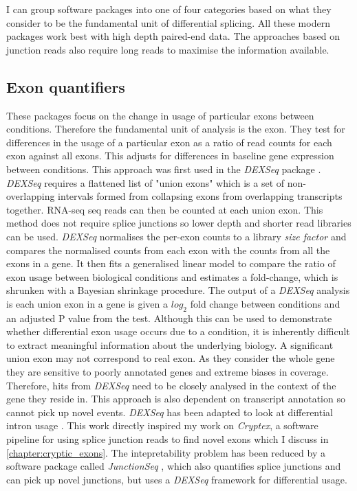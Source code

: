 I can group software packages into one of four categories based on what they consider to be the fundamental unit of differential splicing. 
All these modern packages work best with high depth paired-end data.
The approaches based on junction reads also require long reads to maximise the information available.

\subsection{Exon quantifiers}

These packages focus on the change in usage of particular exons between conditions. Therefore the fundamental unit of analysis is the exon.
They test for differences in the usage of a particular exon as a ratio of read counts for each exon against all exons. 
This adjusts for differences in baseline gene expression between conditions. 
This approach was first used in the \textit{DEXSeq} package \citep{Anders2012}. 
\textit{DEXSeq} requires a flattened list of "union exons" which is a set of non-overlapping intervals formed from collapsing exons from overlapping transcripts together.
RNA-seq seq reads can then be counted at each union exon. 
This method does not require splice junctions so lower depth and shorter read libraries can be used.
\textit{DEXSeq} normalises the per-exon counts to a library \textit{size factor} and compares the  normalised counts from each exon with the counts from all the exons in a gene.
It then fits a generalised linear model to compare the ratio of exon usage between biological conditions and estimates a fold-change, which is shrunken with a Bayesian shrinkage procedure.
The output of a \textit{DEXSeq} analysis is each union exon in a gene is given a $log_2$ fold change between conditions and an adjusted P value from the test. 
Although this can be used to demonstrate whether differential exon usage occurs due to a condition, it is inherently difficult to extract meaningful information about the underlying biology. 
A significant union exon may not correspond to real exon. 
As they consider the whole gene they are sensitive to poorly annotated genes and extreme biases in coverage.
Therefore, hits from \textit{DEXSeq} need to be closely analysed in the context of the gene they reside in. 
This approach is also dependent on transcript annotation so cannot pick up novel events.
\textit{DEXSeq} has been adapted to look at differential intron usage \citep{Li2015a}.
This work directly inspired my work on \textit{Cryptex}, a software pipeline for using splice junction reads to find novel exons which I discuss in \autoref{chapter:cryptic_exons}.
The intepretability problem has been reduced by a software package called \textit{JunctionSeq} \citep{Hartley2015}, which also quantifies splice junctions and can pick up novel junctions, but uses a \textit{DEXSeq} framework for differential usage.

